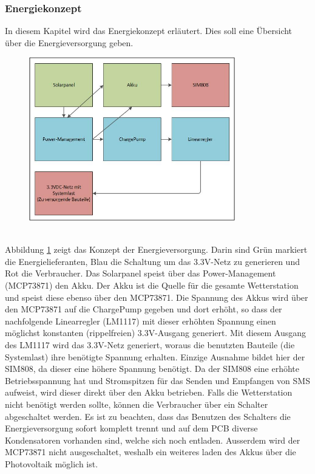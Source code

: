 \subsubsection{Energiekonzept}
\label{subsubsec:Energiekonzept}
In diesem Kapitel wird das Energiekonzept erläutert. Dies soll eine Übersicht über die Energieversorgung geben.\\
\begin{figure}[hbtp]
\centering
\includegraphics[width=0.8\textwidth]{graphics/Energieversorgung/Konzept.JPG}
\label{fig:Energiekonzept}
\end{figure}\\
\newpage
Abbildung \ref{fig:Energiekonzept} zeigt das Konzept der Energieversorgung. Darin sind Grün markiert die Energielieferanten, Blau die Schaltung um das 3.3V-Netz zu generieren und Rot die Verbraucher. Das Solarpanel speist über das Power-Management (MCP73871) den Akku. Der Akku ist die Quelle für die gesamte Wetterstation und speist diese ebenso über den MCP73871. Die Spannung des Akkus wird über den MCP73871 auf die ChargePump gegeben und dort erhöht, so dass der nachfolgende Linearregler (LM1117) mit dieser erhöhten Spannung einen möglichst konstanten (rippelfreien) 3.3V-Ausgang generiert. Mit diesem Ausgang des LM1117 wird das 3.3V-Netz generiert, woraus die benutzten Bauteile (die Systemlast) ihre benötigte Spannung erhalten. Einzige Ausnahme bildet hier der SIM808, da dieser eine höhere Spannung benötigt. Da der SIM808 eine erhöhte Betriebsspannung hat und Stromspitzen für das Senden und Empfangen von SMS aufweist, wird dieser direkt über den Akku betrieben. Falls die Wetterstation nicht benötigt werden sollte, können die Verbraucher über ein Schalter abgeschaltet werden. Es ist zu beachten, dass das Benutzen des Schalters die Energieversorgung sofort komplett trennt und auf dem PCB diverse Kondensatoren vorhanden sind, welche sich noch entladen. Ausserdem wird der MCP73871 nicht ausgeschaltet, weshalb ein weiteres laden des Akkus über die Photovoltaik möglich ist.
